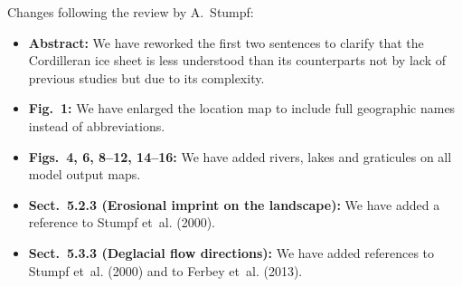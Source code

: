 \bigskip

Changes following the review by A.~Stumpf:

\begin{itemize}

    \item \textbf{Abstract:}
    We have reworked the first two sentences to clarify that the Cordilleran
    ice sheet is less understood than its counterparts not by lack of previous
    studies but due to its complexity.

    \item \textbf{Fig.~1:}
    We have enlarged the location map to include full geographic names instead
    of abbreviations.

    \item \textbf{Figs.~4, 6, 8--12, 14--16:}
    We have added rivers, lakes and graticules on all model output maps.

    \item \textbf{Sect.~5.2.3 (Erosional imprint on the landscape):}
    We have added a reference to Stumpf et~al. (2000).

    \item \textbf{Sect.~5.3.3 (Deglacial flow directions):}
    We have added references to Stumpf et~al. (2000) and to Ferbey et~al. (2013).

\end{itemize}


